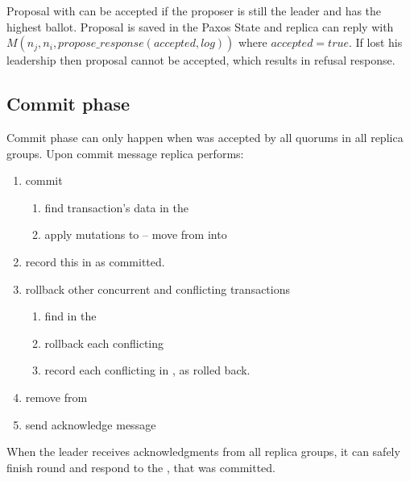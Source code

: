 Proposal with \txState can be accepted if the proposer is still the leader and has the highest ballot. Proposal is saved in the Paxos State and replica can reply with $\mathit{M}(n_j,n_i,\mathit{propose\_response}(accepted, log))$ where $\mathit{accepted}=true$. If  lost his leadership then proposal cannot be accepted, which results in refusal response.

\subsection{Commit phase}
Commit phase can only happen when \txState was accepted by all quorums in all replica groups. Upon commit message replica performs:
\begin{enumerate}
\item commit \mutations
\begin{enumerate}
   \item find transaction’s data in the \txStorage
   \item apply mutations to \database  -- move \mutations from \txStorage into \database
   \end{enumerate}
\item record this \txState in \txLog as committed.
\item rollback other concurrent and conflicting transactions \conflictingTxSet
 \begin{enumerate}
   \item find \conflictingTxSet in the \txIndex
   \item rollback each conflicting 
   \item record each conflicting  in \txLog, as rolled back.
  \end{enumerate}
\item remove \txState from \txIndex
\item send acknowledge message 
\end{enumerate}

When the leader receives acknowledgments from all replica groups, it can safely finish \mpt round and respond to the \client, that \transaction was committed.


